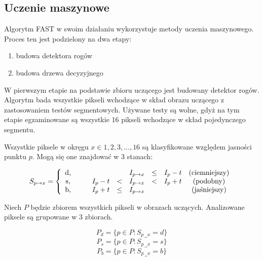 \subsection{Uczenie maszynowe}
Algorytm FAST w swoim działaniu wykorzystuje metody uczenia maszynowego. Proces ten jest podzielony na dwa etapy:
\begin{enumerate}
\item budowa detektora rogów
\item budowa drzewa decyzyjnego
\end{enumerate}


W pierwszym etapie na podstawie zbioru uczącego jest budowany detektor rogów. Algorytm bada wszystkie pikseli wchodzące w skład obrazu uczącego z zastosowaniem testów segmentowych. Używane testy są wolne, gdyż na tym etapie egzaminowane są wszystkie 16 pikseli wchodzące w skład pojedynczego segmentu.

Wszystkie piksele w okręgu $x\in{1,2,3,...,16}$ są klasyfikowane względem jasności punktu $p$. Mogą się one znajdować w 3 stanach:

\begin{equation}
S_{p\rightarrow x} = 
\left\lbrace\begin{array}{cccccccccc}
$d,$ & & &            &      & I_{p\rightarrow x} & \leq & I_{p} - t   &  $(ciemniejszy)$  \\
$s,$ & & & I_{p} - t  & <    & I_{p\rightarrow x} & <    & I_{p} + t   &  $(podobny)$  \\
$b,$ & & & I_{p} + t  & \leq & I_{p\rightarrow x} &      &             &  $(jaśniejszy)$  \\
\end{array}\right.
\end{equation}

Niech $P$ będzie zbiorem wszystkich pikseli w obrazach uczących. Analizowane piksele są grupowane w 3 zbiorach.


\begin{equation}
P_d = \lbrace p \in P : S_{p_\rightarrow x}=d\rbrace
\end{equation}
\begin{equation}
P_s = \lbrace p \in P : S_{p_\rightarrow x}=s\rbrace
\end{equation}
\begin{equation}
P_b = \lbrace p \in P : S_{p_\rightarrow x}=b\rbrace
\end{equation}

